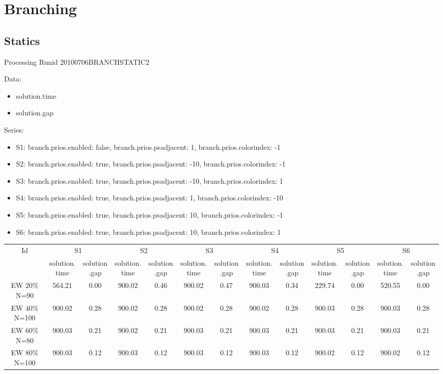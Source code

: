 \documentclass[landscape, 12pt]{report}
\begin{document}
	\section{Branching}
	
	\subsection{Statics}
	
	Processing Runid 20100706BRANCHSTATIC2
	
	Data:
\begin{itemize}
\item solution.time
\item solution.gap
\end{itemize}
Series:
\begin{itemize}
\item S1: branch.prios.enabled: false, branch.prios.psadjacent: 1, branch.prios.colorindex: -1
\item S2: branch.prios.enabled: true, branch.prios.psadjacent: -10, branch.prios.colorindex: -1
\item S3: branch.prios.enabled: true, branch.prios.psadjacent: -10, branch.prios.colorindex: 1
\item S4: branch.prios.enabled: true, branch.prios.psadjacent: 1, branch.prios.colorindex: -10
\item S5: branch.prios.enabled: true, branch.prios.psadjacent: 10, branch.prios.colorindex: -1
\item S6: branch.prios.enabled: true, branch.prios.psadjacent: 10, branch.prios.colorindex: 1
\end{itemize}
\begin{tabular}{|c|cc|cc|cc|cc|cc|cc|}
\hline
\multicolumn{1}{|c|}{Id} & \multicolumn{2}{|c|}{S1} & \multicolumn{2}{|c|}{S2} & \multicolumn{2}{|c|}{S3} & \multicolumn{2}{|c|}{S4} & \multicolumn{2}{|c|}{S5} & \multicolumn{2}{|c|}{S6}
\\
 & solution.time & solution.gap & solution.time & solution.gap & solution.time & solution.gap & solution.time & solution.gap & solution.time & solution.gap & solution.time & solution.gap
\\
\hline
EW 20\% N=90 & 564.21 & 0.00 & 900.02 & 0.46 & 900.02 & 0.47 & 900.03 & 0.34 & 229.74 & 0.00 & 520.55 & 0.00
\\
EW 40\% N=100 & 900.02 & 0.28 & 900.02 & 0.28 & 900.02 & 0.28 & 900.02 & 0.28 & 900.03 & 0.28 & 900.03 & 0.28
\\
EW 60\% N=80 & 900.03 & 0.21 & 900.02 & 0.21 & 900.03 & 0.21 & 900.03 & 0.21 & 900.03 & 0.21 & 900.03 & 0.21
\\
EW 80\% N=100 & 900.03 & 0.12 & 900.03 & 0.12 & 900.03 & 0.12 & 900.03 & 0.12 & 900.02 & 0.12 & 900.02 & 0.12
\\
\hline 
 \end{tabular}
\end{document}
